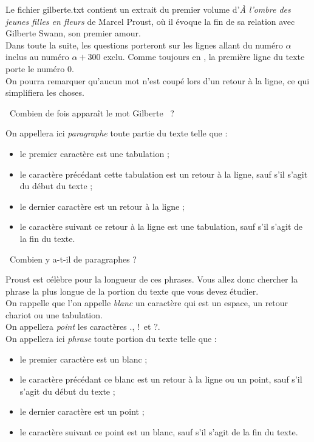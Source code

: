 
Le fichier gilberte.txt contient un extrait du premier volume d'\emph{À l'ombre des jeunes filles 
en fleurs} de Marcel Proust, où il évoque la fin de sa relation avec Gilberte Swann, son 
premier amour.\\
Dans toute la suite, les questions porteront sur les lignes allant du numéro $\alpha$ inclus au 
numéro $\alpha+300$ exclu. Comme toujours en \python, la première ligne du texte porte le numéro 
0.\\
On pourra remarquer qu'aucun mot n'est coupé lors d'un retour à la ligne, ce qui simplifiera les 
choses.

\question\ Combien de fois apparaît le mot \og Gilberte \fg\ ?

\vspace{1cm}

\noindent On appellera ici \emph{paragraphe} toute partie du texte telle que :
\begin{itemize}
 \item le premier caractère est une tabulation ;
\item le caractère précédant cette tabulation est un retour à la  ligne, sauf s'il s'agit du début 
du texte ; 
\item le dernier caractère est un retour à la ligne ;
\item le caractère suivant ce retour à la ligne est une tabulation, sauf s'il s'agit de la fin du 
texte.
\end{itemize}

\question\ Combien y a-t-il de paragraphes ?

\vspace{1cm}

\noindent Proust est célèbre pour la longueur de ces phrases. Vous allez donc chercher la phrase la plus 
longue de la portion du texte que vous devez étudier.\\
On rappelle que l'on appelle \emph{blanc} un caractère qui est un espace, un retour chariot ou une 
tabulation.\\
On appellera \emph{point} les caractères \og.\fg, \og!\fg\ et \og?\fg. \\
On appellera ici \emph{phrase} toute portion du texte telle que :
\begin{itemize}
 \item le premier caractère est un blanc ;
 \item le caractère précédant ce blanc est un retour à la ligne ou un point, sauf s'il s'agit du 
début du texte ;
 \item le dernier caractère est un point ;
 \item le caractère suivant ce point est un blanc, sauf s'il s'agit de la fin du texte.
\end{itemize}

